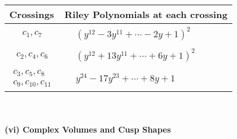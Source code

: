 \documentclass[1p]{elsarticle_modified}
\theoremstyle{definition}
\begin{document}
\begin{tabular}{m{50pt}|m{274pt}}
Crossings & \hspace{64pt}Riley Polynomials at each crossing \\
\hline $$\begin{aligned}c_{1},c_{7}\end{aligned}$$&$\begin{aligned}
&(y^{12}-3 y^{11}+\cdots-2 y+1)^{2}
\end{aligned}$\\
\hline $$\begin{aligned}c_{2},c_{4},c_{6}\end{aligned}$$&$\begin{aligned}
&(y^{12}+13 y^{11}+\cdots+6 y+1)^{2}
\end{aligned}$\\
\hline $$\begin{aligned}c_{3},c_{5},c_{8}\\c_{9},c_{10},c_{11}\end{aligned}$$&$\begin{aligned}
&y^{24}-17 y^{23}+\cdots+8 y+1
\end{aligned}$\\
\hline
\end{tabular}\\~\\
\newpage\flushleft \textbf{(vi) Complex Volumes and Cusp Shapes}
\end{document}
